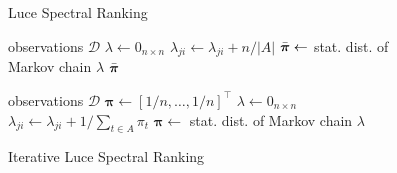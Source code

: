 
\begin{figure}[t]
\centering
\begin{minipage}[t]{2.65in}
  \vspace{0pt}
  \begin{algorithm}[H]
    \caption{Luce Spectral Ranking}
    \label{fi:alg:lsr}
    \begin{algorithmic}[1]
      \Require observations $\mathcal{D}$
      \State $\lambda \gets 0_{n \times n}$
          \State $\lambda_{ji} \gets \lambda_{ji} + n / |A|$
        \EndFor
      \EndFor
      \State $\bar{\bm{\pi}} \gets$ stat. dist. of Markov chain $\lambda$
      \Return $\bar{\bm{\pi}}$
      \newline
      \newline
      \vspace{0.76mm}
    \end{algorithmic}
  \end{algorithm}
\end{minipage}
\hspace{0.05in}
\begin{minipage}[t]{2.65in}
  \vspace{0pt}
  \begin{algorithm}[H]
    \caption{Iterative Luce Spectral Ranking}
    \label{fi:alg:ilsr}
    \begin{algorithmic}[1]
      \Require observations $\mathcal{D}$
      \State $\bm{\pi} \gets [1/n, \ldots, 1/n]^\intercal$
      \Repeat
        \State $\lambda \gets 0_{n \times n}$
            \State $\lambda_{ji} \gets \lambda_{ji} + 1 / \sum_{t \in A} \pi_t$
          \EndFor
        \EndFor
        \State $\bm{\pi} \gets$ stat. dist. of Markov chain $\lambda$
    \end{algorithmic}
  \end{algorithm}
\end{minipage}
\vspace{-0.4cm}
\end{figure}

